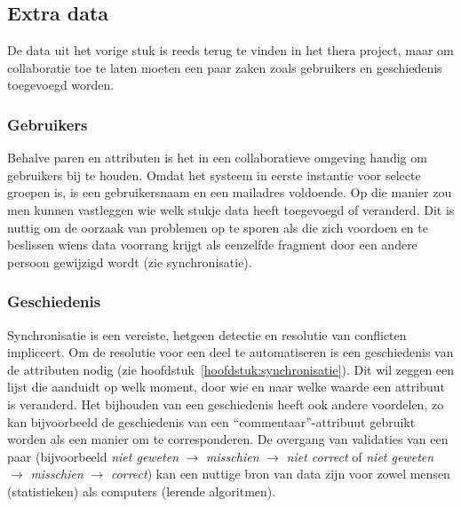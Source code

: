 \subsection{Extra data}
De data uit het vorige stuk is reeds terug te vinden in het thera project, maar om collaboratie toe te laten moeten een paar zaken zoals gebruikers en geschiedenis toegevoegd worden.

\subsubsection{Gebruikers}
Behalve paren en attributen is het in een collaboratieve omgeving handig om gebruikers bij te houden. Omdat het systeem in eerste instantie voor selecte groepen is, is een gebruikersnaam en een mailadres voldoende. Op die manier zou men kunnen vastleggen wie welk stukje data heeft toegevoegd of veranderd. Dit is nuttig om de oorzaak van problemen op te sporen als die zich voordoen en te beslissen wiens data voorrang krijgt als eenzelfde fragment door een andere persoon gewijzigd wordt (zie synchronisatie).

\subsubsection{Geschiedenis}
Synchronisatie is een vereiste, hetgeen detectie en resolutie van conflicten impliceert. Om de resolutie voor een deel te automatiseren is een geschiedenis van de attributen nodig (zie hoofdstuk~\ref{hoofdstuk:synchronisatie}). Dit wil zeggen een lijst die aanduidt op welk moment, door wie en naar welke waarde een attribuut is veranderd. Het bijhouden van een geschiedenis heeft ook andere voordelen, zo kan bijvoorbeeld de geschiedenis van een ``commentaar''-attribuut gebruikt worden als een manier om te corresponderen. De overgang van validaties van een paar (bijvoorbeeld \emph{niet geweten} $\rightarrow$ \emph{misschien} $\rightarrow$ \emph{niet correct} of  \emph{niet geweten} $\rightarrow$ \emph{misschien} $\rightarrow$ \emph{correct}) kan een nuttige bron van data zijn voor zowel mensen (statistieken) als computers (lerende algoritmen).
  

